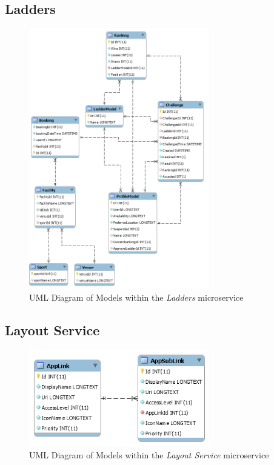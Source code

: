 \subsection{Ladders}
\begin{figure}[H]
    \centering
    \includegraphics[width=0.7\textwidth]{Images/db_uml/ladders.png}
    \caption{UML Diagram of Models within the \textit{Ladders} microservice}
    \label{fig:db_uml:ladders}
\end{figure}

\subsection{Layout Service}
\begin{figure}[H]
    \centering
    \includegraphics[width=0.7\textwidth]{Images/db_uml/layout-service.png}
    \caption{UML Diagram of Models within the \textit{Layout Service} microservice}
    \label{fig:db_uml:layout-service}
\end{figure}

